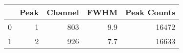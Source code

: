 \begin{tabular}{lrrrr}
\toprule
{} &  Peak &  Channel &  FWHM &  Peak Counts \\
\midrule
0 &     1 &      803 &   9.9 &        16472 \\
1 &     2 &      926 &   7.7 &        16633 \\
\bottomrule
\end{tabular}
